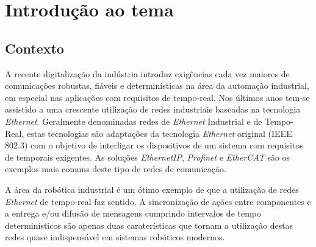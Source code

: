 \section{Introdução ao tema}\label{sec:intro}

%  

\subsection{Contexto}\label{sec:contexto}

A recente digitalização da indústria introduz exigências cada vez maiores de comunicações robustas, fiáveis e determinísticas na área da automação industrial, em especial nas aplicações com requisitos de tempo-real.
Nos últimos anos tem-se assistido a uma crescente utilização de redes industriais baseadas na tecnologia \textit{Ethernet}. Geralmente denominadas redes de \textit{Ethernet} Industrial e de Tempo-Real, estas tecnologias são adaptações
da tecnologia \textit{Ethernet} original (IEEE 802.3) com o objetivo de interligar os dispositivos de um sistema com requisitos de temporais exigentes. As soluções \textit{EthernetIP}, \textit{Profinet} e \textit{EtherCAT} são os exemplos mais comuns
deste tipo de redes de comunicação.

A área da robótica industrial é um ótimo exemplo de que a utilização de redes \textit{Ethernet} de tempo-real faz sentido. A sincronização de ações entre componentes e a entrega e/ou difusão de mensagens cumprindo intervalos de tempo determinísticos são apenas duas
caraterísticas que tornam a utilização destas redes quase indispensável em sistemas robóticos modernos.

